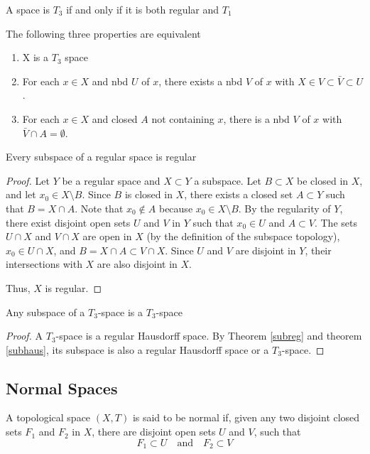 \documentclass[12pt]{article} %
\begin{document}
\begin{theorem}
    A space is $T_3$ if and only if it is both regular and $T_1$
\end{theorem}

\begin{theorem} \parencite{Dugundji1966}
    The following three properties are equivalent
    \begin{enumerate}
        \item X is a $T_3$ space
         \item For each $x \in X$ and nbd $U$ of $x$, there exists a nbd $V$ of $x$ with $X \in V \subset \bar{V} \subset U$.
         \item For each $x \in X$ and closed $A$ not containing $x$, there is a nbd $V$ of $x$ with $\bar{V} \cap A = \emptyset$.
    \end{enumerate}
\end{theorem}

\begin{theorem}
    Every subspace of a regular space is regular \label{subreg}
\end{theorem}
\begin{proof}
 Let \( Y \) be a regular space and \( X \subset Y \) a subspace. Let \( B \subset X \) be closed in \( X \), and let \( x_0 \in X \setminus B \). Since \( B \) is closed in \( X \), there exists a closed set \( A \subset Y \) such that  
\( B = X \cap A \). Note that \( x_0 \notin A \) because \( x_0 \in X \setminus B \). By the regularity of \( Y \), there exist disjoint open sets \( U \) and \( V \) in \( Y \)  
such that \( x_0 \in U \) and \( A \subset V \). The sets \( U \cap X \) and \( V \cap X \) are open in \( X \) (by the definition of the subspace topology),  
\( x_0 \in U \cap X \), and  $B = X \cap A \subset V \cap X$. Since \( U \) and \( V \) are disjoint in \( Y \), their intersections with \( X \) are also disjoint in \( X \).

Thus, \( X \) is regular. 
\end{proof}

\begin{theorem}
    Any subspace of a $T_3$-space is a $T_3$-space
\end{theorem}
\begin{proof}
    A $T_3$-space is a regular Hausdorff space. By Theorem \ref{subreg} and theorem \ref{subhaus}, its subspace is also a regular Hausdorff space or a $T_3$-space.
\end{proof}

\subsection{Normal Spaces}
\begin{definition} \parencite{milewski1994topology}
    A topological space $(X, T)$ is said to be normal if, given any two disjoint closed sets $F_1$ and $F_2$ in $X$, there are disjoint open sets $U$ and $V$, such that
\[ F_1 \subset U \quad \text{and} \quad F_2 \subset V \]
\end{definition}
\end{document}
